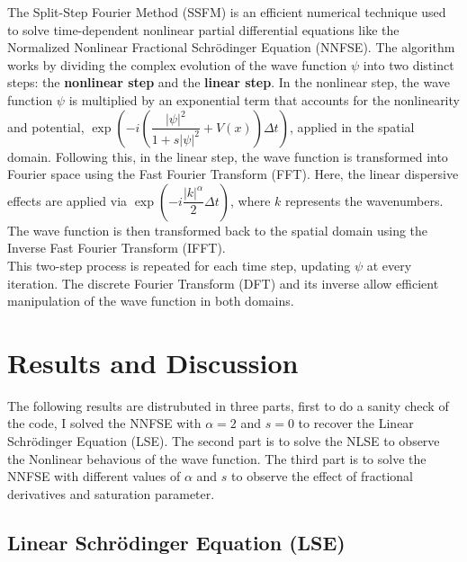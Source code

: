 \documentclass[8pt, a4paper, twocolumn]{article}
\begin{document}
The Split-Step Fourier Method (SSFM) is an efficient numerical technique used to solve time-dependent nonlinear 
partial differential equations like the Normalized Nonlinear Fractional Schrödinger Equation (NNFSE)\cite{weideman1986split}. 
The algorithm works by dividing the complex evolution of the wave function $\psi$ into two distinct steps: 
the \textbf{nonlinear step} and the \textbf{linear step}. In the nonlinear step, the wave function $\psi$ is 
multiplied by an exponential term that accounts for the nonlinearity and potential, 
$\exp\left(-i \left(\dfrac{|\psi|^2}{1 + s|\psi|^2} + V(x)\right) \Delta t\right)$, applied in the spatial 
domain. Following this, in the linear step, the wave function is transformed into Fourier space using the Fast 
Fourier Transform (FFT). Here, the linear dispersive effects are applied via 
$\exp\left(-i \dfrac{|k|^\alpha}{2} \Delta t\right)$, where $k$ represents the wavenumbers. The wave function is then 
transformed back to the spatial domain using the Inverse Fast Fourier Transform (IFFT).\\

This two-step process is repeated for each time step, updating $\psi$ at every iteration. The discrete Fourier 
Transform (DFT) and its inverse allow efficient manipulation of the wave function in both domains.

\section{Results and Discussion}

The following results are distrubuted in three parts, first to do a sanity check of the code, I solved the NNFSE
with $\alpha = 2$ and $s = 0$ to recover the Linear Schrödinger Equation (LSE). The second part is to 
solve the NLSE to observe the Nonlinear behavious of the wave function. The third part is to solve the NNFSE
with different values of $\alpha$ and $s$ to observe the effect of fractional derivatives and saturation parameter.

\subsection{Linear Schrödinger Equation (LSE)}
\end{document}
